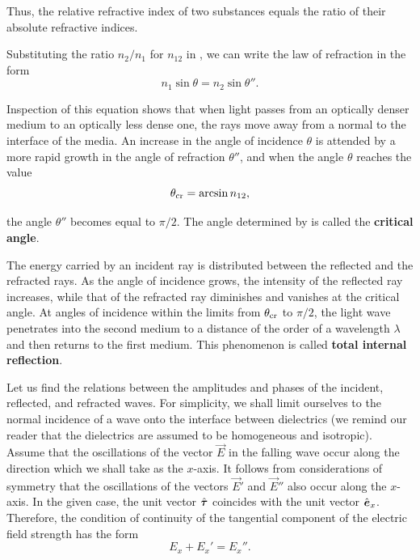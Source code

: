 \noindent
Thus, the relative refractive index of two substances equals the ratio of their absolute refractive indices.

Substituting the ratio $n_2/n_1$ for $n_{12}$ in , we can write the law of refraction in the form
\begin{equation}\label{eq:16_26}
    n_1 \sin\theta = n_2 \sin\theta''.
\end{equation}

\noindent
Inspection of this equation shows that when light passes from an optically denser medium to an optically less dense one, the rays move away from a normal to the interface of the media.
An increase in the angle of incidence $\theta$ is attended by a more rapid growth in the angle of refraction $\theta''$, and when the angle $\theta$ reaches the value
\begin{equation}\label{eq:16_27}
    \theta_{\text{cr}} = \arcsin n_{12},
\end{equation}

\noindent
the angle $\theta''$ becomes equal to $\pi/2$.
The angle determined by  is called the \textbf{critical angle}.

The energy carried by an incident ray is distributed between the reflected and the refracted rays.
As the angle of incidence grows, the intensity of the reflected ray increases, while that of the refracted ray diminishes and vanishes at the critical angle.
At angles of incidence within the limits from $\theta_{\text{cr}}$ to $\pi/2$, the light wave penetrates into the second medium to a distance of the order of a wavelength $\lambda$ and then returns to the first medium.
This phenomenon is called \textbf{total internal reflection}.

Let us find the relations between the amplitudes and phases of the incident, reflected, and refracted waves.
For simplicity, we shall limit ourselves to the normal incidence of a wave onto the interface between dielectrics (we remind our reader that the dielectrics are assumed to be homogeneous and isotropic).
Assume that the oscillations of the vector $\vec{E}$ in the falling wave occur along the direction which we shall take as the $x$-axis.
It follows from considerations of symmetry that the oscillations of the vectors $\vec{E}'$ and $\vec{E}''$ also occur along the $x$-axis.
In the given case, the unit vector $\hat{\boldsymbol{\tau}}$ coincides with the unit vector $\hat{\boldsymbol{e}}_{x}$.
Therefore, the condition of continuity of the tangential component of the electric field strength has the form
\begin{equation}\label{eq:16_28}
    E_x + E_x' = E_x''.
\end{equation}

